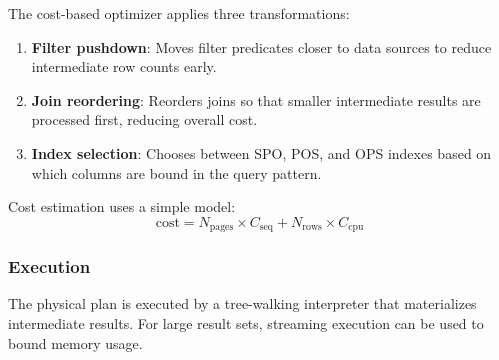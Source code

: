 The cost-based optimizer applies three transformations:

\begin{enumerate}
    \item \textbf{Filter pushdown}: Moves filter predicates closer to data sources to reduce intermediate row counts early.
    \item \textbf{Join reordering}: Reorders joins so that smaller intermediate results are processed first, reducing overall cost.
    \item \textbf{Index selection}: Chooses between SPO, POS, and OPS indexes based on which columns are bound in the query pattern.
\end{enumerate}

Cost estimation uses a simple model:
\[
\text{cost} = N_{\text{pages}} \times C_{\text{seq}} + N_{\text{rows}} \times C_{\text{cpu}}
\]

\subsubsection{Execution}

The physical plan is executed by a tree-walking interpreter that materializes intermediate results. For large result sets, streaming execution can be used to bound memory usage.
